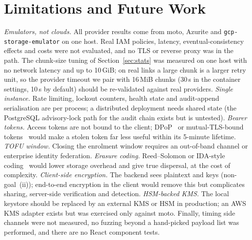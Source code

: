 \documentclass[conference]{IEEEtran}
\newcommand{\code}[1]{\texttt{\small #1}}
\begin{document}
\section{Limitations and Future Work}\label{sec:limits}
\emph{Emulators, not clouds.} All provider results come from moto, Azurite and \code{gcp-storage-emulator} on one host. Real IAM policies, latency, eventual-consistency effects and costs were not evaluated, and no TLS or reverse proxy was in the path. The chunk-size tuning of Section~\ref{sec:stats} was measured on one host with no network latency and up to 10\,GiB; on real links a large chunk is a larger retry unit, so the provider timeout we pair with 16\,MiB chunks (30\,s in the container settings, 10\,s by default) should be re-validated against real providers. \emph{Single instance.} Rate limiting, lockout counters, health state and audit-append serialisation are per process; a distributed deployment needs shared state (the PostgreSQL advisory-lock path for the audit chain exists but is untested). \emph{Bearer tokens.} Access tokens are not bound to the client; DPoP~\cite{rfc9449} or mutual-TLS-bound tokens~\cite{rfc8705} would make a stolen token far less useful within its 5-minute lifetime. \emph{TOFU window.} Closing the enrolment window requires an out-of-band channel or enterprise identity federation. \emph{Erasure coding.} Reed--Solomon or IDA-style coding~\cite{rabin1989,bessani2011depsky} would lower storage overhead and give true dispersal, at the cost of complexity. \emph{Client-side encryption.} The backend sees plaintext and keys (non-goal~(ii)); end-to-end encryption in the client would remove this but complicates sharing, server-side verification and detection. \emph{HSM-backed KMS.} The local keystore should be replaced by an external KMS or HSM in production; an AWS KMS adapter exists but was exercised only against moto. Finally, timing side channels were not measured, no fuzzing beyond a hand-picked payload list was performed, and there are no React component tests.

\end{document}
